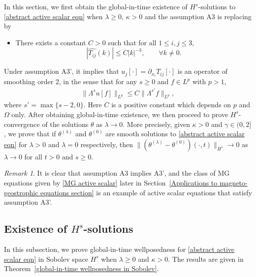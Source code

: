 \documentclass[reqno]{amsart}%
\theoremstyle{definition}
\theoremstyle{remark}
\numberwithin{equation}{section}
\newtheorem{remark}[theorem]{Remark}
\newcommand{\1}{\mathbf{1}}
\numberwithin{equation}{section}
\numberwithin{theorem}{section}
\numberwithin{figure}{section}
\begin{document}
In this section, we first obtain the global-in-time existence of $H^s$-solutions to \eqref{abstract active scalar eqn} when $\lambda\ge0$, $\kappa>0$ and the assumption A3 is replacing by 
\begin{itemize}
\item[A3'.] There exists a constant $C>0$ such that for all $1\le i,j\le 3$, $$|\widehat{T_{ij}}(k)|\le C|k|^{-3}, \qquad\forall k\neq0.$$
\end{itemize}
Under assumption A3', it implies that $u_j[\cdot]=\partial_{x_i} T_{ij}[\cdot]$ is an operator of smoothing order 2, in the sense that for any $s\ge0$ and $f\in L^p$ with $p>1$,
\begin{align}\label{two order smoothing for u when nu>0}
\|\Lambda^s u[f]\|_{L^p}\le C\|\Lambda^{s'}f\|_{L^p},
\end{align}
where $s'=\max\{s-2,0\}$. Here $C$ is a positive constant which depends on $p$ and $\Omega$ only. After obtaining global-in-time existence, we then proceed to prove $H^s$-convergence of the solutions $\theta$ as $\lambda\rightarrow0$. More precisely, given $\kappa>0$ and $\gamma\in(0,2]$, we prove that if $\theta^{(\lambda)}$ and $\theta^{(0)}$ are smooth solutions to \eqref{abstract active scalar eqn} for $\lambda>0$ and $\lambda=0$ respectively, then $\|(\theta^{(\lambda)}-\theta^{(0)})(\cdot,t)\|_{H^s}\rightarrow0$ as $\lambda\rightarrow0$ for all $t>0$ and $s\ge0$. 

\begin{remark}
It is clear that assumption A3 implies A3', and the class of MG equations given by \eqref{MG active scalar} later in Section~\ref{Applications to magneto-geostrophic equations section} is an example of active scalar equations that satisfy assumption A3'.
\end{remark}

\subsection{Existence of $H^s$-solutions}\label{existence of Hs solution subsec}

In this subsection, we prove global-in-time wellposedness for \eqref{abstract active scalar eqn} in Sobolev space $H^s$ when $\lambda\ge0$ and $\kappa>0$. The results are given in Theorem~\ref{global-in-time wellposedness in Sobolev}.
\end{document}
